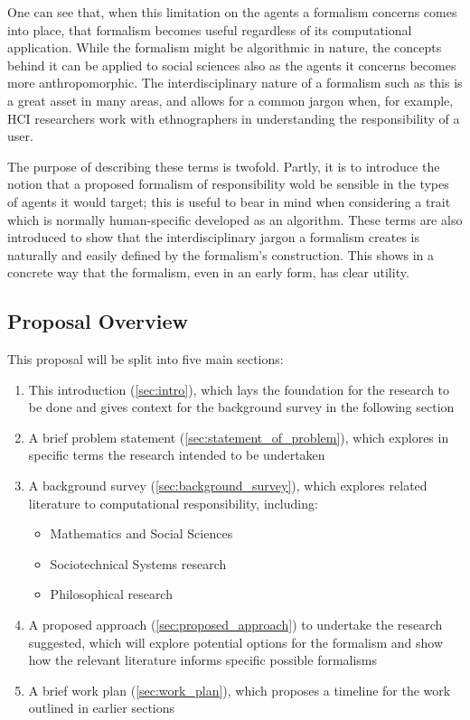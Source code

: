 One can see that, when this limitation on the agents a formalism concerns comes into place, that formalism becomes useful regardless of its computational application. While the formalism might be algorithmic in nature, the concepts behind it can be applied to social sciences also as the agents it concerns becomes more anthropomorphic. The interdisciplinary nature of a formalism such as this is a great asset in many areas, and allows for a common jargon when, for example, HCI researchers work with ethnographers in understanding the responsibility of a user.\par

The purpose of describing these terms is twofold. Partly, it is to introduce the notion that a proposed formalism of responsibility wold be sensible in the types of agents it would target; this is useful to bear in mind when considering a trait which is normally human-specific developed as an algorithm. These terms are also introduced to show that the interdisciplinary jargon a formalism creates is naturally and easily defined by the formalism's construction. This shows in a concrete way that the formalism, even in an early form, has clear utility.\par

\subsection{Proposal Overview}\label{subsec:overview}
This proposal will be split into five main sections:\\
\begin{enumerate}
    \item This introduction (\cref{sec:intro}), which lays the foundation for the research to be done and gives context for the background survey in the following section
    \item A brief problem statement (\cref{sec:statement_of_problem}), which explores in specific terms the research intended to be undertaken
    \item A background survey (\cref{sec:background_survey}), which explores related literature to computational responsibility, including:\\
        \begin{itemize}
            \item Mathematics and Social Sciences
            \item Sociotechnical Systems research
            \item Philosophical research
        \end{itemize}
    \item A proposed approach (\cref{sec:proposed_approach}) to undertake the research suggested, which will explore potential options for the formalism and show how the relevant literature informs specific possible formalisms
    \item A brief work plan (\cref{sec:work_plan}), which proposes a timeline for the work outlined in earlier sections
\end{enumerate}
